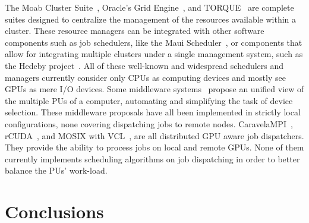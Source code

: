 \documentclass[runningheads,a4paper]{llncs}
\begin{document}


The Moab Cluster Suite~\cite{mabadminguide5.4}, Oracle's Grid Engine~\cite{oraclegridsite}, and TORQUE~\cite{torqueadminman} are complete suites designed to centralize the management of the resources available within a cluster. These resource managers can be integrated with other software components such as job schedulers, like the Maui Scheduler~\cite{mauiadminguide02}, or components that allow for integrating multiple clusters under a single management system, such as the Hedeby project~\cite{hedebysite}. All of these well-known and widespread schedulers and managers currently consider only CPUs as computing devices and mostly see GPUs as mere I/O devices.
%
Some middleware systems~\cite{predictiveheterosched:jimenez10,unifiedheteroarchs:augonnet2008,multigpucpuparal:hermann2010,maestro:spafford10} propose an unified view of the multiple PUs of a computer, automating and simplifying the task of device selection. These middleware proposals have all been implemented in strictly local configurations, none covering dispatching jobs to remote nodes.
%
CaravelaMPI~\cite{caravelampi:syamagiwa09}, rCUDA~\cite{rcuda:duato10}, and MOSIX with VCL~\cite{mosix:barak10,mosixmanual:barak10}, are all distributed GPU aware job dispatchers. They provide the ability to process jobs on local and remote GPUs. None of them currently implements scheduling algorithms on job dispatching in order to better balance the PUs' work-load.




\section{Conclusions}
\label{sec:conclusions}
\end{document}
